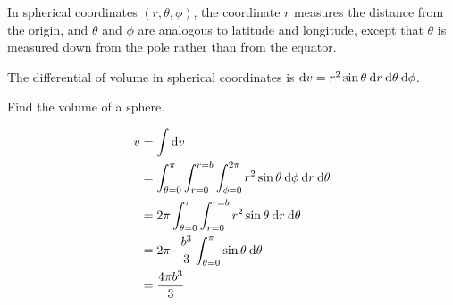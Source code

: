 In spherical coordinates
$(r,\theta,\phi)$, the coordinate
$r$ measures the distance from the origin, and $\theta$ and $\phi$ are analogous to
latitude and longitude, except that $\theta$ is measured down from the pole rather than
from the equator.


The differential of volume in spherical coordinates is $\textup{d} v = r^2\sin\theta \:\textup{d} r\:\textup{d}\theta\:\textup{d}\phi$.

\begin{eg}
\egquestion Find the volume of a sphere.

\eganswer
\begin{align*}
  v &= \int \textup{d} v \\
    &= \int_{\theta=0}^\pi \int_{r=0}^{r=b} \int_{\phi=0}^{2\pi} r^2\sin\theta \:\textup{d}\phi \:\textup{d} r\:\textup{d}\theta \\
    &= 2\pi \int_{\theta=0}^\pi \int_{r=0}^{r=b}  r^2\sin\theta \:\textup{d} r\:\textup{d}\theta \\
    &= 2\pi\cdot\frac{b^3}{3} \int_{\theta=0}^\pi \sin\theta \:\textup{d}\theta \\
    &= \frac{4\pi b^3}{3}
\end{align*}
\end{eg}

